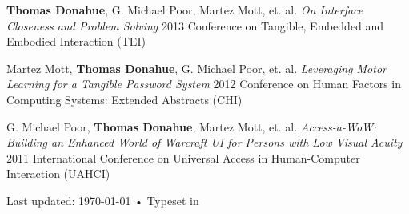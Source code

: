 \documentclass[10pt, letter]{article}
\newcommand{\years}[1]{\marginnote{\footnotesize #1}}
\begin{document}
\vspace{.2cm}
\years{2013} 
\textbf{Thomas Donahue}, G. Michael Poor, Martez Mott, et. al.
\textsl{On Interface Closeness and Problem Solving}
2013 Conference on Tangible, Embedded and Embodied Interaction
(TEI)

\vspace{.2cm}
\years{2012} 
Martez Mott, \textbf{Thomas Donahue}, G. Michael Poor, et. al.
\textsl{Leveraging Motor Learning for a Tangible Password System}
2012 Conference on Human Factors in Computing Systems: Extended Abstracts
(CHI)

\vspace{.2cm}
\years{2011} 
G. Michael Poor, \textbf{Thomas Donahue}, Martez Mott, et. al.
\textsl{Access-a-WoW: Building an Enhanced World of Warcraft \uppercase{UI} for Persons with Low Visual Acuity}
2011 International Conference on Universal Access in Human-Computer Interaction
(UAHCI)



\vspace{0.2cm}
\begin{center}
  {\scriptsize  Last updated: \today\- •\-
    Typeset in \href{http://nitens.org/taraborelli/cvtex}{
      \XeTeX }\\

}
\end{center}
\end{document}
